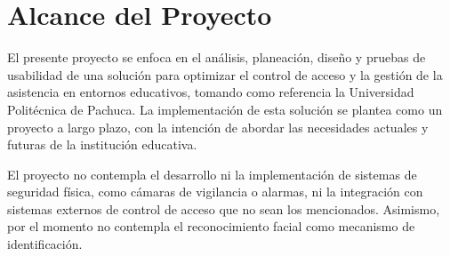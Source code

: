 \section{Alcance del Proyecto}


El presente proyecto se enfoca en el análisis, planeación, diseño y pruebas de usabilidad de una solución para optimizar el control de acceso y la gestión de la asistencia en entornos educativos, tomando como referencia la Universidad Politécnica de Pachuca. La implementación de esta solución se plantea como un proyecto a largo plazo, con la intención de abordar las necesidades actuales y futuras de la institución educativa.


El proyecto no contempla el desarrollo ni la implementación de sistemas de seguridad física, como cámaras de vigilancia o alarmas, ni la integración con sistemas externos de control de acceso que no sean los mencionados. Asimismo, por el momento no contempla el reconocimiento facial como mecanismo de identificación.

